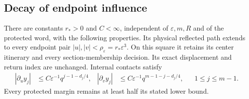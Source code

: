 \subsection{Decay of endpoint influence}
\begin{lemma}
\label{lem:v45-endpoint-collar}
There are constants $r_*>0$ and $C<\infty$, independent of
$\varepsilon,m,R$ and of the protected word, with the following
properties. Its physical reflected path extends to every endpoint pair
$|u|,|v|<\rho_\varepsilon=r_*\varepsilon^3$. On this square it retains
its center itinerary and every section-membership decision. Its exact
displacement and return index are unchanged. Internal contacts satisfy
\begin{align}
 |\partial_u y_j|&\le C\varepsilon^{-1}q^{j-1-d_j/4},&
 |\partial_v y_j|&\le C\varepsilon^{-1}q^{m-1-j-d_j/4},
                   &&1\le j\le m-1.
 \label{eq:v45-endpoint-influence}
\end{align}
Every protected margin remains at least half its stated lower bound.
\end{lemma}
